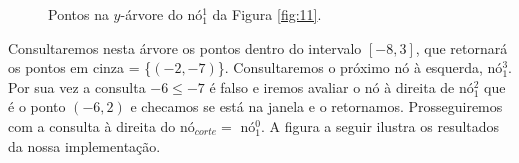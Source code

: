 \begin{figure}[h]
    \centering
{}
\caption{Pontos na $y$-árvore do nó$^1_1$ da Figura \ref{fig:11}.}
\end{figure}

Consultaremos nesta árvore os pontos dentro do intervalo $[-8, 3]$, que retornará os pontos em cinza = \{$(-2,-7)$\}.
Consultaremos o próximo nó à esquerda, nó$^3_1$. Por sua vez a consulta $-6 \leq -7$ é falso e iremos avaliar o nó à direita de nó$^2_1$ que é o ponto $(-6, 2)$ e checamos se está na janela e o retornamos.
Prosseguiremos com a consulta à direita do nó$_{corte}= $ nó$^0_1$. A figura a seguir ilustra os resultados da nossa implementação.

